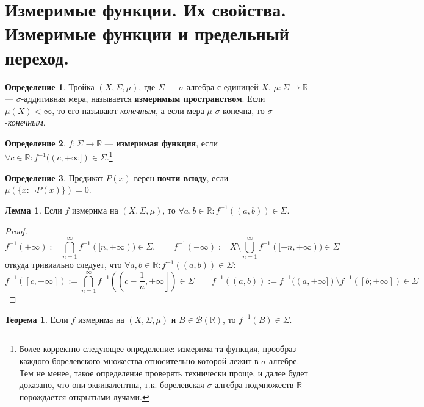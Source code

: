\documentclass[11pt,a4paper]{report}
\def\Real{\mathbb{R}}
\theoremstyle{definition}
\theoremstyle{definition}
\newtheorem{theorem}{Теорема}[section]
\newtheorem{lemma}{Лемма}[section]
\theoremstyle{definition}
\newtheorem{definition}{Определение}[section]
\begin{document}
	\section{Измеримые функции. Их свойства. Измеримые функции и предельный переход.}
	\begin{definition}
		Тройка $ (X, \Sigma, \mu) $, где $ \Sigma $ — $ \sigma $-алгебра с единицей $ X $, $ \mu: \Sigma \to \Real $ — $ \sigma $-аддитивная мера, называется \textbf{измеримым пространством}. Если $ \mu(X) < \infty $, то его называют \textit{конечным}, а если мера $ \mu $ $ \sigma $-конечна, то $ \sigma $-\textit{конечным}.
	\end{definition}
	\begin{definition}
		$ f: \Sigma \to \Real $ — \textbf{измеримая функция}, если $ \forall c \in \Real: f^{-1}((c, +\infty]) \in \Sigma $.\footnote{Более корректно следующее определение: измерима та функция, прообраз каждого борелевского множества относительно которой лежит в $ \sigma $-алгебре. Тем не менее, такое определение проверять технически проще, и далее будет доказано, что они эквивалентны, т.к. борелевская $ \sigma $-алгебра подмножеств $ \Real $ порождается открытыми лучами.}
	\end{definition}
	\begin{definition}
		Предикат $ P(x) $ верен \textbf{почти всюду}, если $ \mu(\{x: \neg P(x) \}) = 0 $.
	\end{definition}
	\begin{lemma}
		Если $ f $ измерима на $ (X, \Sigma, \mu)  $, то $ \forall a, b \in \overline{\Real}: f^{-1}((a, b)) \in \Sigma $.
	\end{lemma}
	\begin{proof}$  $\\
		\[ f^{-1}(+\infty) := \bigcap\limits_{n=1}^{\infty}{f^{-1}([n, +\infty))} \in \Sigma, \quad\quad
		 f^{-1}(-\infty) := X \setminus \bigcup\limits_{n=1}^{\infty}{f^{-1}([-n, +\infty))} \in \Sigma \]
		откуда тривиально следует, что $ \forall a, b \in \overline{\Real}: f^{-1}((a, b)) \in \Sigma $:\\
		\[ f^{-1}([c, +\infty]) := \bigcap\limits_{n=1}^{\infty}{f^{-1}\left ( \left (c-\frac{1}{n}, +\infty\right ]\right )} \in \Sigma \quad\quad f^{-1}((a, b)) := f^{-1}((a, +\infty]) \setminus f^{-1}([b; +\infty]) \in \Sigma \]
	\end{proof}
	\begin{theorem}
		Если $ f $ измерима на $ (X, \Sigma, \mu) $ и $ B \in \mathcal{B}(\Real) $, то $ f^{-1}(B) \in \Sigma $.
	\end{theorem}
\end{document}
